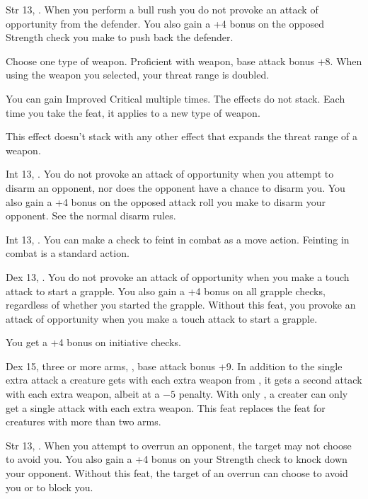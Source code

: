 {}
{Str 13, .}
{When you perform a bull rush you do not provoke an attack of opportunity from the defender. You also gain a +4 bonus on the opposed Strength check you make to push back the defender.}{}{}

{Choose one type of weapon.}
{Proficient with weapon, base attack bonus +8.}
{When using the weapon you selected, your threat range is doubled.}{}
{You can gain Improved Critical multiple times. The effects do not stack. Each time you take the feat, it applies to a new type of weapon.

This effect doesn't stack with any other effect that expands the threat range of a weapon.}{}

{}
{Int 13, .}
{You do not provoke an attack of opportunity when you attempt to disarm an opponent, nor does the opponent have a chance to disarm you. You also gain a +4 bonus on the opposed attack roll you make to disarm your opponent.}
{See the normal disarm rules.}{}

{}
{Int 13, .}
{You can make a  check to feint in combat as a move action.}
{Feinting in combat is a standard action.}{}

{}
{Dex 13, .}
{You do not provoke an attack of opportunity when you make a touch attack to start a grapple. You also gain a +4 bonus on all grapple checks, regardless of whether you started the grapple.}
{Without this feat, you provoke an attack of opportunity when you make a touch attack to start a grapple.}{}

{}
{You get a +4 bonus on initiative checks.}

{}
{Dex 15, three or more arms, , base attack bonus +9.}
{In addition to the single extra attack a creature gets with each extra weapon from , it gets a second attack with each extra weapon, albeit at a $-5$ penalty.}
{With only , a creater can only get a single attack with each extra weapon.}
{This feat replaces the  feat for creatures with more than two arms.}

{}
{Str 13, .}
{When you attempt to overrun an opponent, the target may not choose to avoid you. You also gain a +4 bonus on your Strength check to knock down your opponent.}
{Without this feat, the target of an overrun can choose to avoid you or to block you.}{}

